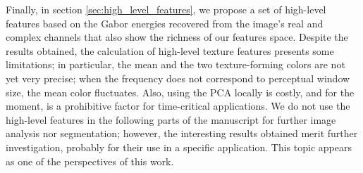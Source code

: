 Finally, in section \ref{sec:high_level_features}, we propose a set of high-level features based on the Gabor energies recovered from the image's real and complex channels that also show the richness of our features space. Despite the results obtained, the calculation of high-level texture features presents some limitations; in particular, the mean and the two texture-forming colors are not yet very precise; when the frequency does not correspond to perceptual window size, the mean color fluctuates. Also, using the PCA locally is costly, and for the moment, is a prohibitive factor for time-critical applications. We do not use the high-level features in the following parts of the manuscript for further image analysis nor segmentation; however, the interesting results obtained merit further investigation, probably for their use in a specific application. This topic appears as one of the perspectives of this work.


